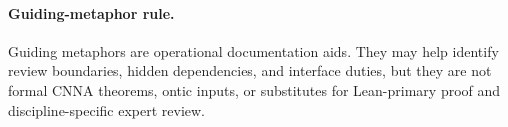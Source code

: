 \paragraph{Guiding-metaphor rule.} Guiding metaphors are operational documentation aids. They may help identify review boundaries, hidden dependencies, and interface duties, but they are not formal CNNA theorems, ontic inputs, or substitutes for Lean-primary proof and discipline-specific expert review.

